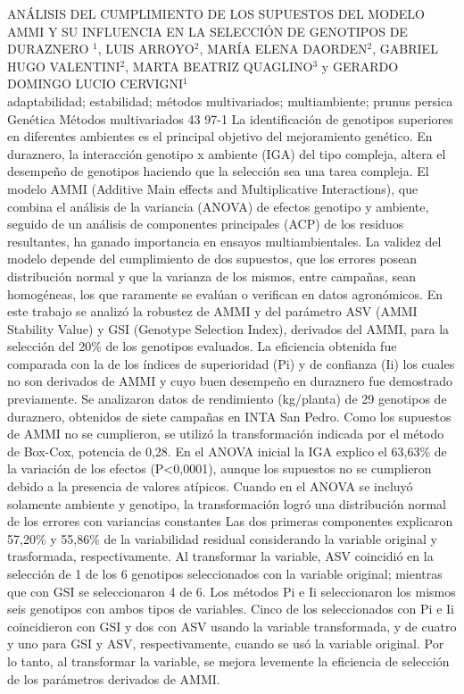 \A
{ANÁLISIS DEL CUMPLIMIENTO DE LOS SUPUESTOS DEL MODELO AMMI Y SU INFLUENCIA EN LA SELECCIÓN DE GENOTIPOS DE DURAZNERO}
{$^1$, LUIS ARROYO$^2$, MARÍA ELENA DAORDEN$^2$, GABRIEL HUGO VALENTINI$^2$, MARTA BEATRIZ QUAGLINO$^3$ y GERARDO DOMINGO LUCIO CERVIGNI$^1$}
{
\\}
{adaptabilidad; estabilidad; métodos multivariados; multiambiente; prunus persica} 
 {Genética} 
 {Métodos multivariados} 
 {43} 
 {97-1}
{La identificación de genotipos superiores en diferentes ambientes es el principal objetivo del mejoramiento genético. En duraznero, la interacción genotipo x ambiente (IGA) del tipo compleja, altera el desempeño de genotipos haciendo que la selección sea una tarea compleja. El modelo AMMI (Additive Main effects and Multiplicative Interactions), que combina el análisis de la variancia (ANOVA) de efectos genotipo y ambiente, seguido de un análisis de componentes principales (ACP) de los residuos resultantes, ha ganado importancia en ensayos multiambientales. La validez del modelo depende del cumplimiento de dos supuestos, que los errores posean distribución normal y que la varianza de los mismos, entre campañas, sean homogéneas, los que raramente se evalúan o verifican en datos agronómicos. En este trabajo se analizó la robustez de AMMI y del parámetro ASV (AMMI Stability Value) y GSI (Genotype Selection Index), derivados del AMMI, para la selección del 20\% de los genotipos evaluados. La eficiencia obtenida fue comparada con la de los índices de superioridad (Pi) y de confianza (Ii) los cuales no son derivados de AMMI y cuyo buen desempeño en duraznero fue demostrado previamente. Se analizaron datos de rendimiento (kg/planta) de 29 genotipos de duraznero, obtenidos de siete campañas en INTA San Pedro. Como los supuestos de AMMI no se cumplieron, se utilizó la transformación indicada por el método de Box-Cox, potencia de 0,28. En el ANOVA inicial la IGA explico el 63,63\% de la variación de los efectos (P<0,0001), aunque los supuestos no se cumplieron debido a la presencia de valores atípicos. Cuando en el ANOVA se incluyó solamente ambiente y genotipo, la transformación logró una distribución normal de los errores con variancias constantes Las dos primeras componentes explicaron 57,20\% y 55,86\% de la variabilidad residual considerando la variable original y trasformada, respectivamente. Al transformar la variable, ASV coincidió en la selección de 1 de los 6 genotipos seleccionados con la variable original; mientras que con GSI se seleccionaron 4 de 6. Los métodos Pi e Ii seleccionaron los mismos seis genotipos con ambos tipos de variables. Cinco de los seleccionados con Pi e Ii coincidieron con GSI y dos con ASV usando la variable transformada, y de cuatro y uno para GSI y ASV, respectivamente, cuando se usó la variable original. Por lo tanto, al transformar la variable, se mejora levemente la eficiencia de selección de los parámetros derivados de AMMI.}
